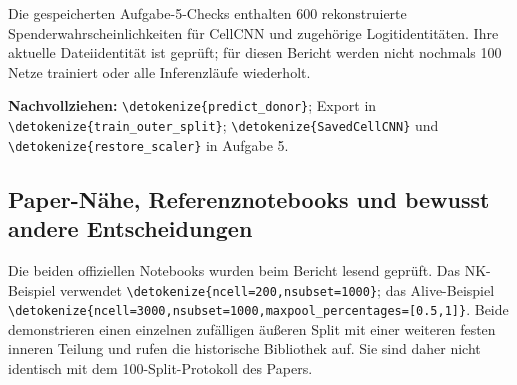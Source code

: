 \documentclass[11pt,a4paper]{article}
\newcommand{\code}[1]{\expandafter\nolinkurl\expandafter{\detokenize{#1}}}
\newcommand{\source}[1]{\par{\footnotesize\raggedright\color{muted}\textbf{Nachvollziehen:} #1\par}}
\begin{document}
Die gespeicherten Aufgabe-5-Checks enthalten 600 rekonstruierte
Spenderwahrscheinlichkeiten für CellCNN und zugehörige Logitidentitäten.
Ihre aktuelle Dateiidentität ist geprüft; für diesen Bericht werden
nicht nochmals 100 Netze trainiert oder alle Inferenzläufe wiederholt.
\source{\code{predict_donor}; Export in \code{train_outer_split};
\code{SavedCellCNN} und \code{restore_scaler} in Aufgabe 5.}

\clearpage
\subsection*{Paper-Nähe, Referenznotebooks und bewusst andere Entscheidungen}
Die beiden offiziellen Notebooks wurden beim Bericht lesend geprüft.
Das NK-Beispiel verwendet \code{ncell=200,nsubset=1000}; das Alive-Beispiel
\code{ncell=3000,nsubset=1000,maxpool_percentages=[0.5,1]}.
Beide demonstrieren einen einzelnen zufälligen äußeren Split mit einer
weiteren festen inneren Teilung und rufen die historische Bibliothek auf.
Sie sind daher nicht identisch mit dem 100-Split-Protokoll des Papers.
\end{document}
